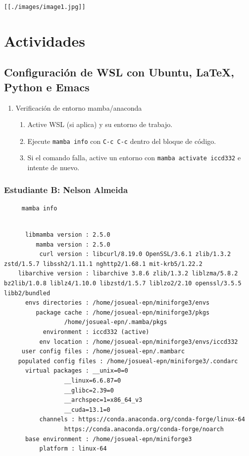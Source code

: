 \documentclass{article}
\begin{document}
\begin{verbatim}
[[./images/image1.jpg]]
\end{verbatim}
\section{Actividades}
\label{sec:orga888783}
\subsection{Configuración de WSL con Ubuntu, \LaTeX, Python e Emacs}
\label{sec:org7ed8225}

\begin{enumerate}
\item Verificación de entorno mamba/anaconda
\begin{enumerate}
\item Active WSL (si aplica) y su entorno de trabajo.
\item Ejecute \texttt{mamba info} con \texttt{C-c C-c} dentro del bloque de código.
\item Si el comando falla, active un entorno con \texttt{mamba activate iccd332} e intente de nuevo.
\end{enumerate}
\end{enumerate}

\subsubsection{Estudiante B: Nelson Almeida}
\label{sec:org8d7b235}
\begin{verbatim}
     mamba info
\end{verbatim}

\begin{verbatim}

	  libmamba version : 2.5.0
	     mamba version : 2.5.0
	      curl version : libcurl/8.19.0 OpenSSL/3.6.1 zlib/1.3.2 zstd/1.5.7 libssh2/1.11.1 nghttp2/1.68.1 mit-krb5/1.22.2
	libarchive version : libarchive 3.8.6 zlib/1.3.2 liblzma/5.8.2 bz2lib/1.0.8 liblz4/1.10.0 libzstd/1.5.7 liblzo2/2.10 openssl/3.5.5 libb2/bundled
	  envs directories : /home/josueal-epn/miniforge3/envs
	     package cache : /home/josueal-epn/miniforge3/pkgs
			     /home/josueal-epn/.mamba/pkgs
	       environment : iccd332 (active)
	      env location : /home/josueal-epn/miniforge3/envs/iccd332
	 user config files : /home/josueal-epn/.mambarc
    populated config files : /home/josueal-epn/miniforge3/.condarc
	  virtual packages : __unix=0=0
			     __linux=6.6.87=0
			     __glibc=2.39=0
			     __archspec=1=x86_64_v3
			     __cuda=13.1=0
		  channels : https://conda.anaconda.org/conda-forge/linux-64
			     https://conda.anaconda.org/conda-forge/noarch
	  base environment : /home/josueal-epn/miniforge3
		  platform : linux-64
\end{verbatim}
\end{document}

